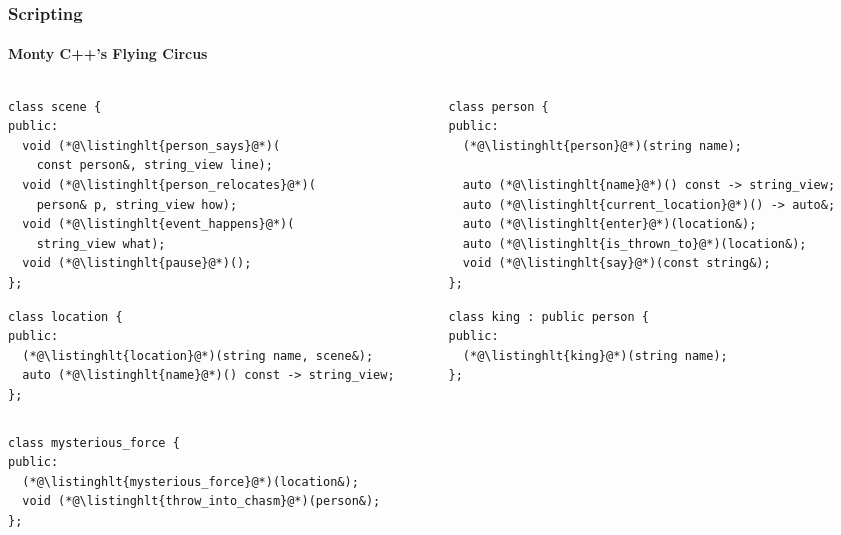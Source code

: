 \documentclass[aspectratio=169,compress,table,xcolor=table]{beamer}
\begin{document}
\begin{frame}[fragile]
  \frametitle{Scripting}
  \framesubtitle{Monty C++'s Flying Circus}
  \begin{columns}
    \begin{column}{.50\textwidth}
    \begin{lstlisting}[language=c++2x,basicstyle=\tiny\ttfamily]
class scene {
public:
  void (*@\listinghlt{person_says}@*)(
    const person&, string_view line);
  void (*@\listinghlt{person_relocates}@*)(
    person& p, string_view how);
  void (*@\listinghlt{event_happens}@*)(
    string_view what);
  void (*@\listinghlt{pause}@*)();
};

    \end{lstlisting}
    \begin{lstlisting}[language=c++2x,basicstyle=\tiny\ttfamily]
class location {
public:
  (*@\listinghlt{location}@*)(string name, scene&);
  auto (*@\listinghlt{name}@*)() const -> string_view;
};
    \end{lstlisting}
    \end{column}
    \begin{column}{.50\textwidth}
    \begin{lstlisting}[language=c++2x,basicstyle=\tiny\ttfamily]
class person {
public:
  (*@\listinghlt{person}@*)(string name);

  auto (*@\listinghlt{name}@*)() const -> string_view;
  auto (*@\listinghlt{current_location}@*)() -> auto&;
  auto (*@\listinghlt{enter}@*)(location&);
  auto (*@\listinghlt{is_thrown_to}@*)(location&);
  void (*@\listinghlt{say}@*)(const string&);
};
    \end{lstlisting}
    \begin{lstlisting}[language=c++2x,basicstyle=\tiny\ttfamily]
class king : public person {
public:
  (*@\listinghlt{king}@*)(string name);
};
    \end{lstlisting}
    \end{column}
  \end{columns}
  \begin{lstlisting}[language=c++2x,basicstyle=\scriptsize\ttfamily]
class mysterious_force {
public:
  (*@\listinghlt{mysterious_force}@*)(location&);
  void (*@\listinghlt{throw_into_chasm}@*)(person&);
};
    \end{lstlisting}
\end{frame}
\end{document}
